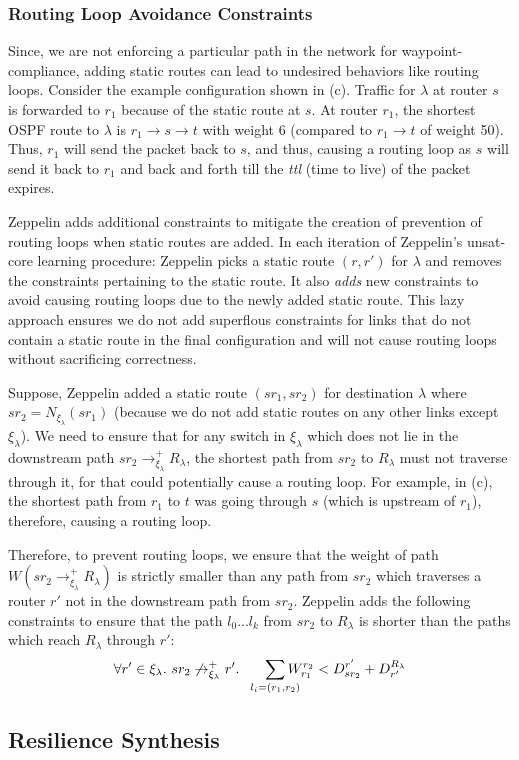 \subsubsection{Routing Loop Avoidance Constraints} \label{sec:loopavoidance}
Since, we are not enforcing a particular path in the network for waypoint-
compliance, adding
static routes can lead to undesired behaviors like routing loops.  
Consider the example configuration shown in (c). 
Traffic for $\lambda$ at router $s$ is forwarded to $r_1$ because of the
static route at $s$. At router $r_1$, the shortest OSPF route to
$\lambda$ is $r_1 \rightarrow s \rightarrow t$ with weight 6 (compared 
to $r_1 \rightarrow t$ of weight 50). Thus, $r_1$ will send the 
packet back to $s$, and thus, causing a routing loop as $s$ will send
it back to $r_1$ and back and forth till the \emph{ttl} (time to live) of the
packet expires. 

Zeppelin adds additional constraints to mitigate the creation of prevention
of routing loops when static routes are added. In each iteration of
Zeppelin's unsat-core learning procedure: 
Zeppelin picks a static route $(r, r')$
for $\lambda$ and removes the constraints pertaining to 
the static route. It also \emph{adds} new constraints to avoid
causing routing loops due to the newly added static route. This
lazy approach ensures we do not add superflous constraints for links
that do not contain a static route in the final configuration 
and will not cause routing loops without sacrificing correctness. 

Suppose, Zeppelin added a static route $(sr_1, sr_2)$ for destination
$\lambda$ where $sr_2 = N_{\xi_\lambda}(sr_1)$ (because we do not add
static routes on any other links except $\xi_\lambda$). We need to
ensure that for any switch in $\xi_\lambda$ which does not 
lie in the downstream path $sr_2 \rightarrow^+_{\xi_\lambda} R_\lambda$, 
the shortest path from $sr_2$ to $R_\lambda$ must not traverse through 
it, for that could potentially cause a routing loop. For example, in (c), the shortest path from $r_1$ to $t$ was
going through $s$ (which is upstream of $r_1$), therefore, causing 
a routing loop. 

Therefore, to prevent routing loops, we ensure that the weight
of path $W(sr_2 \rightarrow^+_{\xi_\lambda} R_\lambda)$ is 
strictly smaller than any path from $sr_2$ which traverses a
router $r'$ not in the downstream path from $sr_2$. Zeppelin
adds the following constraints to ensure that the path $l_0...l_k$
from $sr_2$ to $R_\lambda$ is shorter than the paths which reach 
$R_\lambda$ through $r'$: 
\begin{equation}
\forall r' \in \xi_\lambda. ~sr_2 \not\rightarrow_{\xi_\lambda}^+ r'. 
~~~~~\sum_{\mathclap{\substack{l_i=(r_1,r_2)}}} 
W_{r_1}^{r_2} < D^{r'}_{sr_2} + D_{r'}^{R_\lambda} 
\end{equation}

\subsection{Resilience Synthesis}


